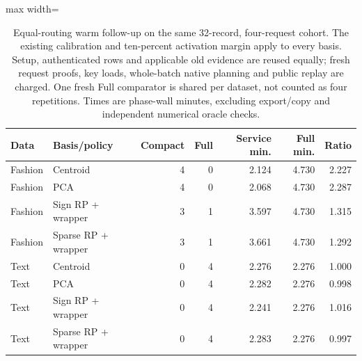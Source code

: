 \begin{table}[tbp]
\centering
\small
\caption{Equal-routing warm follow-up on the same 32-record, four-request cohort. The existing calibration and ten-percent activation margin apply to every basis. Setup, authenticated rows and applicable old evidence are reused equally; fresh request proofs, key loads, whole-batch native planning and public replay are charged. One fresh Full comparator is shared per dataset, not counted as four repetitions. Times are phase-wall minutes, excluding export/copy and independent numerical oracle checks.}
\label{tab:latest-warm}
\begin{adjustbox}{max width=\textwidth}
\begin{tabular*}{.98\textwidth}{@{\extracolsep{\fill}}llrrrrr@{}}
\toprule
Data & Basis/policy & Compact & Full & Service min. & Full min. & Ratio\\
\midrule
Fashion & Centroid & 4 & 0 & 2.124 & 4.730 & 2.227\\
Fashion & PCA & 4 & 0 & 2.068 & 4.730 & 2.287\\
Fashion & Sign RP + wrapper & 3 & 1 & 3.597 & 4.730 & 1.315\\
Fashion & Sparse RP + wrapper & 3 & 1 & 3.661 & 4.730 & 1.292\\
Text & Centroid & 0 & 4 & 2.276 & 2.276 & 1.000\\
Text & PCA & 0 & 4 & 2.282 & 2.276 & 0.998\\
Text & Sign RP + wrapper & 0 & 4 & 2.241 & 2.276 & 1.016\\
Text & Sparse RP + wrapper & 0 & 4 & 2.283 & 2.276 & 0.997\\
\bottomrule
\end{tabular*}
\end{adjustbox}
\end{table}
